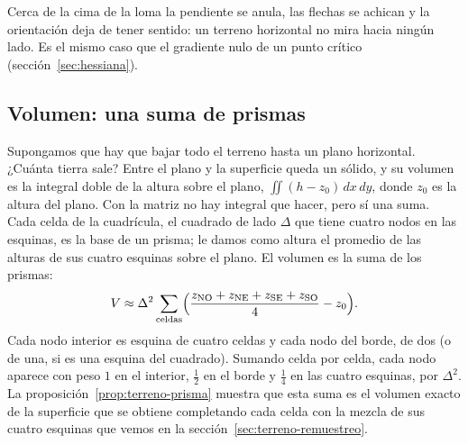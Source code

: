 Cerca de la cima de la loma la pendiente se anula, las flechas se achican y la orientación
deja de tener sentido: un terreno horizontal no mira hacia ningún lado. Es el mismo caso que el
gradiente nulo de un punto crítico (sección~\ref{sec:hessiana}).


\subsection{Volumen: una suma de prismas}\label{sec:terreno-volumen}

Supongamos que hay que bajar todo el terreno hasta un plano horizontal. ¿Cuánta tierra sale?
Entre el plano y la superficie queda un sólido, y su volumen es la integral doble de la altura
sobre el plano, \(\iint (h-z_0)\,dx\,dy\), donde \(z_0\) es la altura del plano. Con la matriz
no hay integral que hacer, pero sí una suma. Cada celda de la cuadrícula, el cuadrado de lado
\(\Delta\) que tiene cuatro nodos en las esquinas, es la base de un prisma; le damos como altura
el promedio de las alturas de sus cuatro esquinas sobre el plano. El volumen es la suma de los
prismas:
\[
  V\approx\Delta^2\sum_{\text{celdas}}\Bigl(\frac{z_{\mathrm{NO}}+z_{\mathrm{NE}}+z_{\mathrm{SE}}+z_{\mathrm{SO}}}{4}-z_0\Bigr).
\]
Cada nodo interior es esquina de cuatro celdas y cada nodo del borde, de dos (o de una, si es
una esquina del cuadrado). Sumando celda por celda, cada nodo aparece con peso \(1\) en el
interior, \(\tfrac12\) en el borde y \(\tfrac14\) en las cuatro esquinas, por \(\Delta^2\). La
proposición~\ref{prop:terreno-prisma} muestra que esta suma es el volumen exacto de la superficie
que se obtiene completando cada celda con la mezcla de sus cuatro esquinas que vemos en la
sección~\ref{sec:terreno-remuestreo}.

